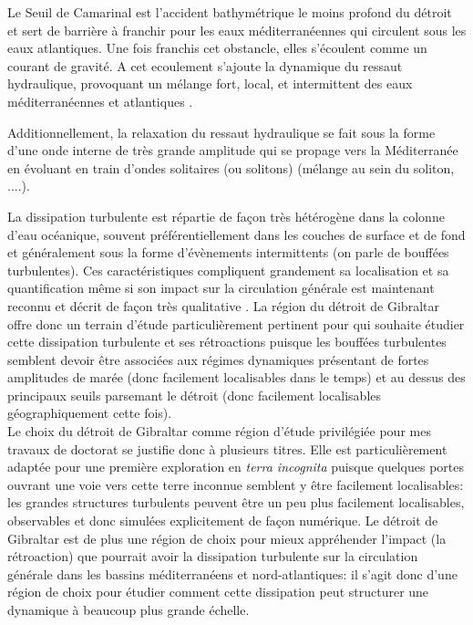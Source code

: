 Le Seuil de Camarinal est l'accident bathymétrique le moins profond du détroit et sert de barrière à franchir pour les eaux méditerranéennes qui circulent sous les eaux atlantiques. Une fois franchis cet obstancle, elles s'écoulent comme un courant de gravité. A cet ecoulement s'ajoute la dynamique du ressaut hydraulique, provoquant un mélange fort, local, et intermittent des eaux méditerranéennes et atlantiques \citep{wesson_1994,GarciaLafuente2011}.

Additionnellement, la relaxation du ressaut hydraulique se fait sous la forme d'une onde interne de très grande amplitude qui se propage vers la Méditerranée en évoluant en train d'ondes solitaires (ou solitons) (mélange au sein du soliton, ....)\citep{vlasenko_2009}. 




\color{blue}
La dissipation turbulente est répartie de façon très hétérogène dans la colonne d'eau océanique, souvent préférentiellement dans les couches de surface et de fond et généralement sous la forme d'évènements intermittents (on parle de bouffées turbulentes). Ces caractéristiques compliquent grandement sa localisation et sa quantification même si son impact sur la circulation générale est maintenant reconnu et décrit de façon très qualitative \cite{de_lavergne_abyssal_2017}. La région du détroit de Gibraltar offre donc un terrain d'étude particulièrement pertinent pour qui souhaite étudier cette dissipation turbulente et ses rétroactions puisque les bouffées turbulentes semblent devoir être associées aux régimes dynamiques présentant de fortes amplitudes de marée (donc facilement localisables dans le temps) et au dessus des principaux seuils parsemant le détroit (donc facilement localisables géographiquement cette fois).\\
Le choix du détroit de Gibraltar comme région d'étude privilégiée pour mes travaux de doctorat se justifie donc à plusieurs titres. Elle est particulièrement adaptée pour une première exploration en \textit{terra incognita} puisque quelques portes ouvrant une voie vers cette terre inconnue semblent y être facilement localisables: les grandes structures turbulents peuvent être un peu plus facilement localisables, observables et donc simulées explicitement de façon numérique. Le détroit de Gibraltar est de plus une région de choix pour mieux appréhender l'impact (la rétroaction) que pourrait avoir la dissipation turbulente sur la circulation générale dans les bassins méditerranéens et nord-atlantiques: il s'agit donc d'une région de choix pour étudier comment cette dissipation peut structurer une dynamique à beaucoup plus grande échelle.
\color{black}

